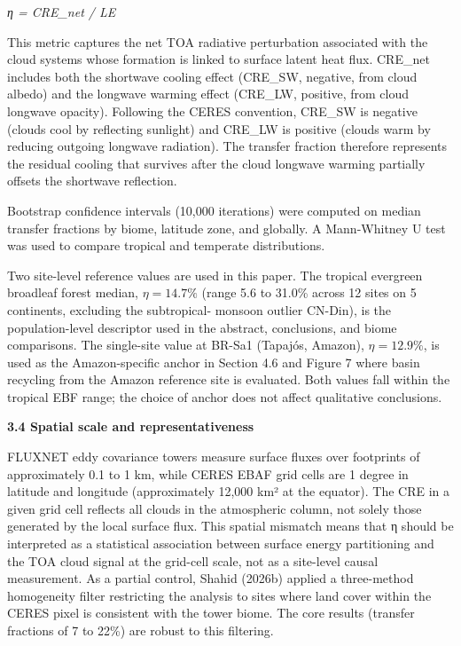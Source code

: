 \emph{η = \textbar CRE\_net\textbar{} / LE}

This metric captures the net TOA radiative perturbation associated with
the cloud systems whose formation is linked to surface latent heat flux.
CRE\_net includes both the shortwave cooling effect (CRE\_SW, negative,
from cloud albedo) and the longwave warming effect (CRE\_LW, positive,
from cloud longwave opacity). Following the CERES convention, CRE\_SW is
negative (clouds cool by reflecting sunlight) and CRE\_LW is positive
(clouds warm by reducing outgoing longwave radiation). The transfer
fraction therefore represents the residual cooling that survives after
the cloud longwave warming partially offsets the shortwave reflection.

Bootstrap confidence intervals (10,000 iterations) were computed on
median transfer fractions by biome, latitude zone, and globally. A
Mann-Whitney U test was used to compare tropical and temperate
distributions.

Two site-level reference values are used in this paper. The tropical
evergreen broadleaf forest median, $\eta = 14.7\%$ (range 5.6 to
31.0\% across 12 sites on 5 continents, excluding the subtropical-
monsoon outlier CN-Din), is the population-level descriptor used in
the abstract, conclusions, and biome comparisons.
The single-site value at BR-Sa1 (Tapajós, Amazon), $\eta = 12.9\%$,
is used as the Amazon-specific anchor in Section 4.6 and Figure 7
where basin recycling from the Amazon reference site is evaluated.
Both values fall within the tropical EBF range; the choice of anchor
does not affect qualitative conclusions.

\textbf{3.4 Spatial scale and representativeness}

FLUXNET eddy covariance towers measure surface fluxes over footprints of
approximately 0.1 to 1 km, while CERES EBAF grid cells are 1 degree in
latitude and longitude (approximately 12,000 km² at the equator). The
CRE in a given grid cell reflects all clouds in the atmospheric column,
not solely those generated by the local surface flux. This spatial
mismatch means that η should be interpreted as a statistical association
between surface energy partitioning and the TOA cloud signal at the
grid-cell scale, not as a site-level causal measurement. As a partial
control, Shahid (2026b) applied a three-method homogeneity filter
restricting the analysis to sites where land cover within the CERES
pixel is consistent with the tower biome. The core results (transfer
fractions of 7 to 22\%) are robust to this filtering.

